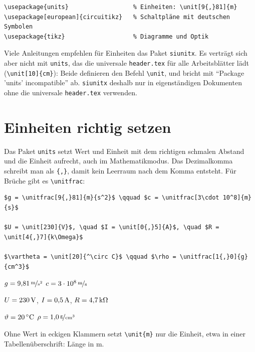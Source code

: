 \begin{lstlisting}[style=latex]
\usepackage{units}                  % Einheiten: \unit[9{,}81]{m}
\usepackage[european]{circuitikz}   % Schaltpläne mit deutschen Symbolen
\usepackage{tikz}                   % Diagramme und Optik
\end{lstlisting}

\begin{hinweis}[siunitx]
	Viele Anleitungen empfehlen für Einheiten das Paket \texttt{siunitx}. Es verträgt sich aber nicht mit \texttt{units}, das die universale \texttt{header.tex} für alle Arbeitsblätter lädt (\texttt{\textbackslash unit[10]\{cm\}}): Beide definieren den Befehl \texttt{\textbackslash unit}, und  bricht mit \enquote{Package 'units' incompatible} ab. \texttt{siunitx} deshalb nur in eigenständigen Dokumenten ohne die universale \texttt{header.tex} verwenden.
\end{hinweis}



\section{Einheiten richtig setzen}

Das Paket \texttt{units} setzt Wert und Einheit mit dem richtigen schmalen Abstand und die Einheit aufrecht, auch im Mathematikmodus. Das Dezimalkomma schreibt man als \texttt{\{,\}}, damit kein Leerraum nach dem Komma entsteht. Für Brüche gibt es \texttt{\textbackslash unitfrac}:

\begin{lstlisting}[style=latex]
$g = \unitfrac[9{,}81]{m}{s^2}$ \qquad $c = \unitfrac[3\cdot 10^8]{m}{s}$

$U = \unit[230]{V}$, \quad $I = \unit[0{,}5]{A}$, \quad $R = \unit[4{,}7]{k\Omega}$

$\vartheta = \unit[20]{^\circ C}$ \qquad $\rho = \unitfrac[1{,}0]{g}{cm^3}$
\end{lstlisting}

\begin{ausgabe}
	$g = \unitfrac[9{,}81]{m}{s^2}$ \qquad $c = \unitfrac[3\cdot 10^8]{m}{s}$

	$U = \unit[230]{V}$, \quad $I = \unit[0{,}5]{A}$, \quad $R = \unit[4{,}7]{k\Omega}$

	$\vartheta = \unit[20]{^\circ C}$ \qquad $\rho = \unitfrac[1{,}0]{g}{cm^3}$
\end{ausgabe}

Ohne Wert in eckigen Klammern setzt \texttt{\textbackslash unit\{m\}} nur die Einheit, etwa in einer Tabellenüberschrift: Länge in \unit{m}.

